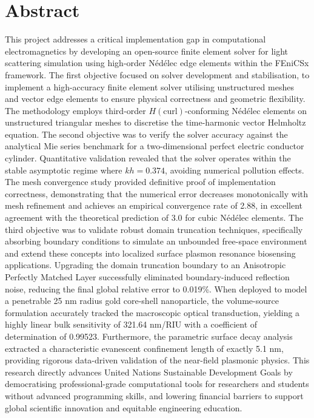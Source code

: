  
\chapter*{Abstract}
 
This project addresses a critical implementation gap in computational electromagnetics by developing an open-source finite element solver for light scattering simulation using high-order N\'{e}d\'{e}lec edge elements within the FEniCSx framework. The first objective focused on solver development and stabilisation, to implement a high-accuracy finite element solver utilising unstructured meshes and vector edge elements to ensure physical correctness and geometric flexibility. The methodology employs third-order $H(\text{curl})$-conforming N\'{e}d\'{e}lec elements on unstructured triangular meshes to discretise the time-harmonic vector Helmholtz equation. The second objective was to verify the solver accuracy against the analytical Mie series benchmark for a two-dimensional perfect electric conductor cylinder. Quantitative validation revealed that the solver operates within the stable asymptotic regime where $kh = 0.374$, avoiding numerical pollution effects. The mesh convergence study provided definitive proof of implementation correctness, demonstrating that the numerical error decreases monotonically with mesh refinement and achieves an empirical convergence rate of 2.88, in excellent agreement with the theoretical prediction of 3.0 for cubic N\'{e}d\'{e}lec elements. The third objective was to validate robust domain truncation techniques, specifically absorbing boundary conditions to simulate an unbounded free-space environment and extend these concepts into localized surface plasmon resonance biosensing applications. Upgrading the domain truncation boundary to an Anisotropic Perfectly Matched Layer successfully eliminated boundary-induced reflection noise, reducing the final global relative error to 0.019\%. When deployed to model a penetrable 25 nm radius gold core-shell nanoparticle, the volume-source formulation accurately tracked the macroscopic optical transduction, yielding a highly linear bulk sensitivity of 321.64 nm/RIU with a coefficient of determination of 0.99523. Furthermore, the parametric surface decay analysis extracted a characteristic evanescent confinement length of exactly 5.1 nm, providing rigorous data-driven validation of the near-field plasmonic physics. This research directly advances United Nations Sustainable Development Goals by democratising professional-grade computational tools for researchers and students without advanced programming skills, and lowering financial barriers to support global scientific innovation and equitable engineering education.